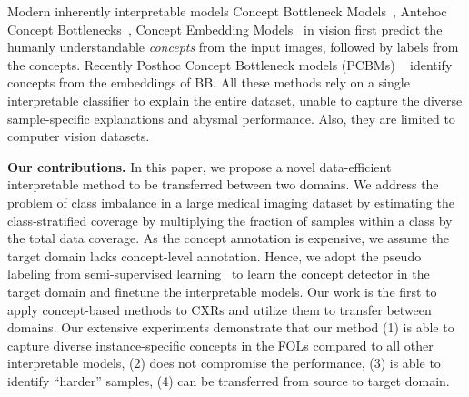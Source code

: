 
Modern inherently interpretable models \eg Concept Bottleneck Models~\cite{koh2020concept}, Antehoc Concept Bottlenecks~\cite{sarkar2021inducing}, Concept Embedding Models~\cite{zarlenga2022concept} in vision first predict the humanly understandable \emph{concepts} from the input images, followed by labels from the concepts. Recently Posthoc Concept Bottleneck models (PCBMs) ~\cite{yuksekgonul2022post} identify concepts from the embeddings of BB. All these methods rely on a single interpretable classifier to explain the entire dataset, unable to capture the diverse sample-specific explanations and abysmal performance. Also, they are limited to computer vision datasets.


\textbf{Our contributions.}
 In this paper, we propose a novel data-efficient interpretable method to be transferred between two domains. We address the problem of class imbalance in a large medical imaging dataset by estimating the class-stratified coverage by multiplying the fraction of samples within a class by the total data coverage. As the concept annotation is expensive, we assume the target domain lacks concept-level annotation. Hence, we adopt the pseudo labeling from semi-supervised learning~\cite{lee2013pseudo} to learn the concept detector in the target domain and finetune the interpretable models. Our work is the first to apply concept-based methods to CXRs and utilize them to transfer between domains. 
 Our extensive experiments demonstrate that our method (1) is able to capture diverse instance-specific concepts in the FOLs compared to all other interpretable models, (2) does not compromise the performance, (3) is able to identify  ``harder'' samples, (4) can be transferred from source to target domain.
 
